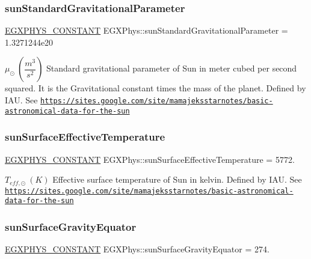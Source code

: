 \subsubsection{\texorpdfstring{sun\+Standard\+Gravitational\+Parameter}{sunStandardGravitationalParameter}}
{\footnotesize\ttfamily \mbox{\hyperlink{group___e_g_x_phys-_constants-_macros_ga76980d288494ce1714c9ac68a95ba702}{E\+G\+X\+P\+H\+Y\+S\+\_\+\+C\+O\+N\+S\+T\+A\+NT}} E\+G\+X\+Phys\+::sun\+Standard\+Gravitational\+Parameter = 1.\+3271244e20}

$ \mu_{\odot} \ (\dfrac{m^3}{s^2})$ Standard gravitational parameter of Sun in meter cubed per second squared. It is the Gravitational constant times the mass of the planet. Defined by I\+AU. See \href{https://sites.google.com/site/mamajeksstarnotes/basic-astronomical-data-for-the-sun}{\tt https\+://sites.\+google.\+com/site/mamajeksstarnotes/basic-\/astronomical-\/data-\/for-\/the-\/sun} \mbox{\label{group___e_g_x_phys-_constants-_astrophysics-_solar_system-_sun-_bulk_gac4f767d22333fd9a17ddd59e37d03545}} 
\subsubsection{\texorpdfstring{sun\+Surface\+Effective\+Temperature}{sunSurfaceEffectiveTemperature}}
{\footnotesize\ttfamily \mbox{\hyperlink{group___e_g_x_phys-_constants-_macros_ga76980d288494ce1714c9ac68a95ba702}{E\+G\+X\+P\+H\+Y\+S\+\_\+\+C\+O\+N\+S\+T\+A\+NT}} E\+G\+X\+Phys\+::sun\+Surface\+Effective\+Temperature = 5772.}

$ T_{eff,\odot} \ (K)$ Effective surface temperature of Sun in kelvin. Defined by I\+AU. See \href{https://sites.google.com/site/mamajeksstarnotes/basic-astronomical-data-for-the-sun}{\tt https\+://sites.\+google.\+com/site/mamajeksstarnotes/basic-\/astronomical-\/data-\/for-\/the-\/sun} \mbox{\label{group___e_g_x_phys-_constants-_astrophysics-_solar_system-_sun-_bulk_ga041c4c2f7860c1b1fa4435b2be962c50}} 
\subsubsection{\texorpdfstring{sun\+Surface\+Gravity\+Equator}{sunSurfaceGravityEquator}}
{\footnotesize\ttfamily \mbox{\hyperlink{group___e_g_x_phys-_constants-_macros_ga76980d288494ce1714c9ac68a95ba702}{E\+G\+X\+P\+H\+Y\+S\+\_\+\+C\+O\+N\+S\+T\+A\+NT}} E\+G\+X\+Phys\+::sun\+Surface\+Gravity\+Equator = 274.}

